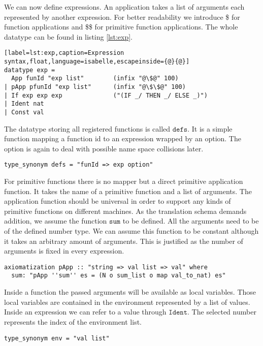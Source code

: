 We can now define expressions.
An application takes a list of arguments each represented by another expression.
For better readability we introduce \$ for function applications and \$\$ for primitive function applications.
The whole datatype can be found in listing \ref{lst:exp}.
\begin{lstlisting}[label=lst:exp,caption=Expression syntax,float,language=isabelle,escapeinside={@}{@}]
datatype exp =
  App funId "exp list"        (infix "@\$@" 100)
| pApp pfunId "exp list"      (infix "@\$\$@" 100)
| If exp exp exp              ("(IF _/ THEN _/ ELSE _)")
| Ident nat
| Const val
\end{lstlisting}

The datatype storing all registered functions is called $\texttt{defs}$.
It is a simple function mapping a function id to an expression wrapped by an option.
The option is again to deal with possible name space collisions later.
\begin{lstlisting}[mathescape=true,language=isabelle]
type_synonym defs = "funId => exp option"
\end{lstlisting}

For primitive functions there is no mapper but a direct primitive application function.
It takes the name of a primitive function and a list of arguments.
The application function should be universal in order to support any kinds of primitive functions on different machines.
As the translation schema demands addition, we assume the function $\texttt{sum}$ to be defined.
All the arguments need to be of the defined number type.
We can assume this function to be constant although it takes an arbitrary amount of arguments.
This is justified as the number of arguments is fixed in every expression.
\begin{lstlisting}[mathescape=true,language=isabelle]
axiomatization pApp :: "string => val list => val" where
  sum: "pApp ''sum'' es = (N o sum_list o map val_to_nat) es"
\end{lstlisting}

Inside a function the passed arguments will be available as local variables.
Those local variables are contained in the environment represented by a list of values.
Inside an expression we can refer to a value through $\texttt{Ident}$.
The selected number represents the index of the environment list.
\begin{lstlisting}[language=isabelle]
type_synonym env = "val list"
\end{lstlisting}

